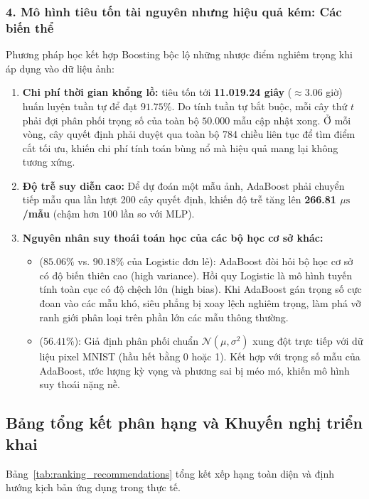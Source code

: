 \subsubsection{4. Mô hình tiêu tốn tài nguyên nhưng hiệu quả kém: Các biến thể }
Phương pháp học kết hợp Boosting bộc lộ những nhược điểm nghiêm trọng khi áp dụng vào dữ liệu ảnh:
\begin{enumerate}
    \item \textbf{Chi phí thời gian khổng lồ:}  tiêu tốn tới \textbf{11.019.24 giây} ($\approx 3.06$ giờ) huấn luyện tuần tự để đạt $91.75\%$. Do tính tuần tự bắt buộc, mỗi cây thứ $t$ phải đợi phân phối trọng số của toàn bộ $50.000$ mẫu cập nhật xong. Ở mỗi vòng, cây quyết định phải duyệt qua toàn bộ 784 chiều liên tục để tìm điểm cắt tối ưu, khiến chi phí tính toán bùng nổ mà hiệu quả mang lại không tương xứng.
    \item \textbf{Độ trễ suy diễn cao:} Để dự đoán một mẫu ảnh, AdaBoost phải chuyển tiếp mẫu qua lần lượt 200 cây quyết định, khiến độ trễ tăng lên \textbf{266.81 $\mu\text{s}$/mẫu} (chậm hơn $100$ lần so với MLP).
    \item \textbf{Nguyên nhân suy thoái toán học của các bộ học cơ sở khác:}
    \begin{itemize}
        \item {} ($85.06\%$ vs. $90.18\%$ của Logistic đơn lẻ): AdaBoost đòi hỏi bộ học cơ sở có độ biến thiên cao (high variance). Hồi quy Logistic là mô hình tuyến tính toàn cục có độ chệch lớn (high bias). Khi AdaBoost gán trọng số cực đoan vào các mẫu khó, siêu phẳng bị xoay lệch nghiêm trọng, làm phá vỡ ranh giới phân loại trên phần lớn các mẫu thông thường.
        \item {} ($56.41\%$): Giả định phân phối chuẩn $\mathcal{N}(\mu, \sigma^2)$ xung đột trực tiếp với dữ liệu pixel MNIST (hầu hết bằng 0 hoặc 1). Kết hợp với trọng số mẫu của AdaBoost, ước lượng kỳ vọng và phương sai bị méo mó, khiến mô hình suy thoái nặng nề.
    \end{itemize}
\end{enumerate}

\subsection{Bảng tổng kết phân hạng và Khuyến nghị triển khai}
Bảng~\ref{tab:ranking_recommendations} tổng kết xếp hạng toàn diện và định hướng kịch bản ứng dụng trong thực tế.

